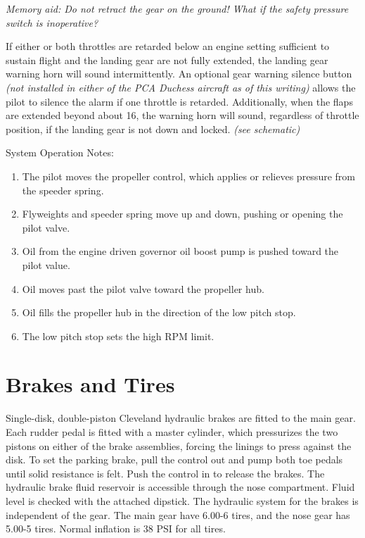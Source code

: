 {\emph{Memory aid: Do not retract the gear on the ground! What if the safety pressure switch is inoperative?}

If either or both throttles are retarded below an engine setting sufficient to sustain flight and the landing gear are not
fully extended, the landing gear warning horn will sound intermittently. An optional gear warning silence button
\emph{(not installed in either of the PCA Duchess aircraft as of this writing)}
allows the pilot to silence the alarm if one throttle is retarded. Additionally, when the flaps are extended beyond
about 16\degree, the warning horn will sound, regardless of throttle position, if the landing gear is not down and locked.
\emph{(see schematic)}

System Operation Notes:
\begin{enumerate}
\item The pilot moves the propeller control, which applies or relieves pressure from the speeder spring.
\item Flyweights and speeder spring move up and down, pushing or opening the pilot valve.
\item Oil from the engine driven governor oil boost pump is pushed toward the pilot value.
\item Oil moves past the pilot valve toward the propeller hub.
\item Oil fills the propeller hub in the direction of the low pitch stop.
\item The low pitch stop sets the high RPM limit.
\end{enumerate}

\section{Brakes and Tires}

Single-disk, double-piston Cleveland hydraulic brakes are fitted to the main gear. Each rudder pedal is fitted with a
master cylinder, which pressurizes the two pistons on either of the brake assemblies, forcing the linings to press
against the disk. To set the parking brake, pull the control out and pump both toe pedals until solid resistance is felt.
Push the control in to release the brakes. The hydraulic brake fluid reservoir is accessible through the nose
compartment. Fluid level is checked with the attached dipstick. The hydraulic system for the brakes is independent
of the gear. The main gear have 6.00-6 tires, and the nose gear has 5.00-5 tires. Normal inflation is 38 PSI for all
tires.

}
